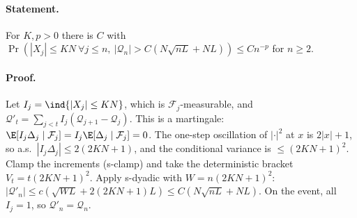 \paragraph{Statement.} For $K,p>0$ there is $C$ with $\Pr(|X_j|\leq KN\ \forall j\leq n,\ |\mathcal Q_n|>C(N\sqrt{nL}+NL))\leq Cn^{-p}$ for $n\geq2$.
\paragraph{Proof.} Let $I_j=\ind\{|X_j|\leq KN\}$, which is $\mathcal F_j$-measurable, and $\mathcal Q'_t=\sum_{j<t}I_j(\mathcal Q_{j+1}-\mathcal Q_j)$. This is a martingale: $\E[I_j\Delta_j\mid\mathcal F_j]=I_j\E[\Delta_j\mid\mathcal F_j]=0$.
The one-step oscillation of $|\cdot|^2$ at $x$ is $2|x|+1$, so a.s.\ $|I_j\Delta_j|\leq2(2KN+1)$, and the conditional variance is $\leq(2KN+1)^2$. Clamp the increments
(s-clamp) and take the deterministic bracket $V_t=t(2KN+1)^2$. Apply s-dyadic with $W=n(2KN+1)^2$: $|\mathcal Q'_n|\leq c(\sqrt{WL}+2(2KN+1)L)\leq C(N\sqrt{nL}+NL)$.
On the event, all $I_j=1$, so $\mathcal Q'_n=\mathcal Q_n$.
